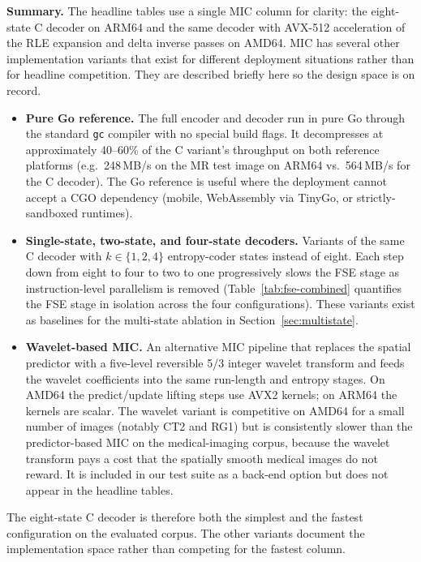 \documentclass[journal]{IEEEtran}
\begin{document}
\textbf{Summary.} The headline tables use a single MIC column for
clarity: the eight-state C decoder on ARM64 and the same decoder with
AVX-512 acceleration of the RLE expansion and delta inverse passes on
AMD64. MIC has several other implementation variants that exist for
different deployment situations rather than for headline competition.
They are described briefly here so the design space is on record.

\begin{itemize}
  \item \textbf{Pure Go reference.} The full encoder and decoder run in
  pure Go through the standard \texttt{gc} compiler with no special build
  flags. It decompresses at approximately 40--60\% of the C variant's
  throughput on both reference platforms (e.g.\ 248\,MB/s on the MR test
  image on ARM64 vs.\ 564\,MB/s for the C decoder). The Go reference is
  useful where the deployment cannot accept a CGO dependency (mobile,
  WebAssembly via TinyGo, or strictly-sandboxed runtimes).
  \item \textbf{Single-state, two-state, and four-state decoders.}
  Variants of the same C decoder with $k\in\{1,2,4\}$ entropy-coder
  states instead of eight. Each step down from eight to four to two to
  one progressively slows the FSE stage as instruction-level parallelism
  is removed (Table~\ref{tab:fse-combined} quantifies the FSE stage in
  isolation across the four configurations). These variants exist as
  baselines for the multi-state ablation in
  Section~\ref{sec:multistate}.
  \item \textbf{Wavelet-based MIC.} An alternative MIC pipeline that
  replaces the spatial predictor with a five-level reversible 5/3 integer
  wavelet transform and feeds the wavelet coefficients into the same
  run-length and entropy stages. On AMD64 the predict/update lifting
  steps use AVX2 kernels; on ARM64 the kernels are scalar. The
  wavelet variant is competitive on AMD64 for a small number of images
  (notably CT2 and RG1) but is consistently slower than the
  predictor-based MIC on the medical-imaging corpus, because the wavelet
  transform pays a cost that the spatially smooth medical images do not
  reward. It is included in our test suite as a back-end option but does
  not appear in the headline tables.
\end{itemize}

The eight-state C decoder is therefore both the simplest and the fastest
configuration on the evaluated corpus. The other variants document the
implementation space rather than competing for the fastest column.
\end{document}
